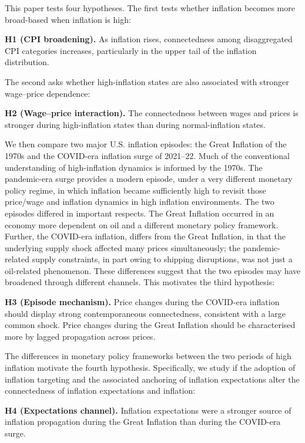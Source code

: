 \documentclass{article}
\begin{document}
This paper tests four hypotheses. The first tests whether
inflation becomes more broad-based when inflation is high:

\noindent\textbf{H1 (CPI broadening).} As inflation rises, connectedness among
disaggregated CPI categories increases, particularly in the upper tail of the
inflation distribution.

The second asks whether high-inflation states are also associated with stronger
wage--price dependence:

\noindent\textbf{H2 (Wage--price interaction).} The connectedness between wages
and prices is stronger during high-inflation states than during normal-inflation
states.

We then compare two major U.S. inflation episodes: the Great Inflation of the
1970s and the COVID-era inflation surge of 2021--22. Much of the conventional
understanding of high-inflation dynamics is informed by the 1970s. The
pandemic-era surge provides a modern episode, under a very different
monetary policy regime, in which inflation became sufficiently high to revisit
those price/wage and inflation dynamics in high inflation environments. The two episodes differed in important respects. The Great
Inflation occurred in an economy more dependent on oil and a different monetary policy framework. Further, the COVID-era inflation, differs from the Great Inflation, in that the underlying supply shock affected many prices simultaneously; the pandemic-related supply constraints, in part owing to shipping disruptions, was not just a oil-related phenomenon. These differences suggest that the two episodes may have
broadened through different channels. This motivates the third hypothesis:

\noindent\textbf{H3 (Episode mechanism).} Price changes during the COVID-era inflation should display strong contemporaneous connectedness, consistent with a large common
shock. Price changes during the Great Inflation should be characterised more by lagged propagation
across prices.

The differences in monetary policy frameworks between the two periods of high inflation motivate the fourth hypothesis. Specifically, we study if the adoption of inflation targeting and the associated anchoring of inflation expectations alter the
connectedness of inflation expectations and inflation:

\noindent\textbf{H4 (Expectations channel).} Inflation expectations were a
stronger source of inflation propagation during the Great Inflation than during
the COVID-era surge.
\end{document}
